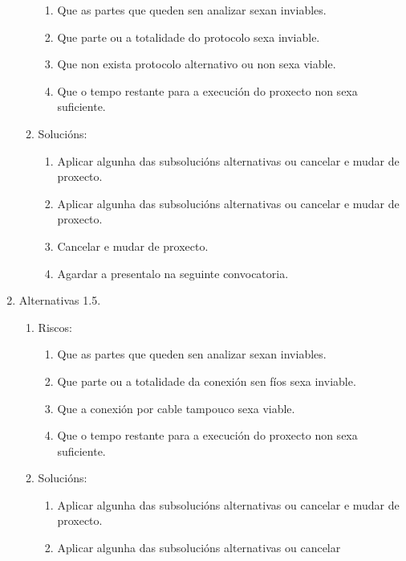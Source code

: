 \begin{enumerate}
\begin{enumerate}
\begin{enumerate}
                \item Que as partes que queden sen analizar sexan inviables.
                \item Que parte ou a totalidade do protocolo sexa inviable.
                \item Que non exista protocolo alternativo ou non sexa viable.
                \item Que o tempo restante para a execución do proxecto non
                      sexa suficiente.
               \end{enumerate}
         \item Solucións:
               \begin{enumerate}
                \item Aplicar algunha das subsolucións alternativas ou cancelar
                      e mudar de proxecto.
                \item Aplicar algunha das subsolucións alternativas ou cancelar
                      e mudar de proxecto.
                \item Cancelar e mudar de proxecto.
                \item Agardar a presentalo na seguinte convocatoria.
               \end{enumerate}
        \end{enumerate}
  \item Alternativas 1.5.
        \begin{enumerate}
         \item Riscos:
               \begin{enumerate}
                \item Que as partes que queden sen analizar sexan inviables.
                \item Que parte ou a totalidade da conexión sen fíos sexa
                      inviable.
                \item Que a conexión por cable tampouco sexa viable.
                \item Que o tempo restante para a execución do proxecto non
                      sexa suficiente.
               \end{enumerate}
         \item Solucións:
               \begin{enumerate}
                \item Aplicar algunha das subsolucións alternativas ou cancelar
                      e mudar de proxecto.
                \item Aplicar algunha das subsolucións alternativas ou cancelar

\end{enumerate}
\end{enumerate}
\end{enumerate}
